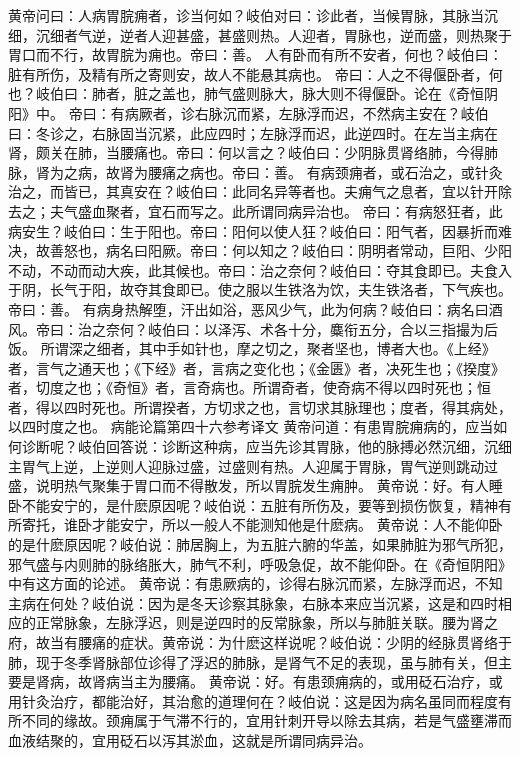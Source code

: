 \documentclass[a4paper,12pt,UTF8,twoside]{ctexbook}
\begin{document}
黄帝问曰：人病胃脘痈者，诊当何如？岐伯对曰：诊此者，当候胃脉，其脉当沉细，沉细者气逆，逆者人迎甚盛，甚盛则热。人迎者，胃脉也，逆而盛，则热聚于胃口而不行，故胃脘为痈也。帝曰：善。
人有卧而有所不安者，何也？岐伯曰：脏有所伤，及精有所之寄则安，故人不能悬其病也。
帝曰：人之不得偃卧者，何也？岐伯曰：肺者，脏之盖也，肺气盛则脉大，脉大则不得偃卧。论在《奇恒阴阳》中。
帝曰：有病厥者，诊右脉沉而紧，左脉浮而迟，不然病主安在？岐伯曰：冬诊之，右脉固当沉紧，此应四时；左脉浮而迟，此逆四时。在左当主病在肾，颇关在肺，当腰痛也。帝曰：何以言之？岐伯曰：少阴脉贯肾络肺，今得肺脉，肾为之病，故肾为腰痛之病也。帝曰：善。
有病颈痈者，或石治之，或针灸治之，而皆已，其真安在？岐伯曰：此同名异等者也。夫痈气之息者，宜以针开除去之；夫气盛血聚者，宜石而写之。此所谓同病异治也。
帝曰：有病怒狂者，此病安生？岐伯曰：生于阳也。帝曰：阳何以使人狂？岐伯曰：阳气者，因暴折而难决，故善怒也，病名曰阳厥。帝曰：何以知之？岐伯曰：阴明者常动，巨阳、少阳不动，不动而动大疾，此其候也。帝曰：治之奈何？岐伯曰：夺其食即已。夫食入于阴，长气于阳，故夺其食即已。使之服以生铁洛为饮，夫生铁洛者，下气疾也。帝曰：善。
有病身热解堕，汗出如浴，恶风少气，此为何病？岐伯曰：病名曰酒风。帝曰：治之奈何？岐伯曰：以泽泻、术各十分，麋衔五分，合以三指撮为后饭。
所谓深之细者，其中手如针也，摩之切之，聚者坚也，博者大也。《上经》者，言气之通天也；《下经》者，言病之变化也；《金匮》者，决死生也；《揆度》者，切度之也；《奇恒》者，言奇病也。所谓奇者，使奇病不得以四时死也；恒者，得以四时死也。所谓揆者，方切求之也，言切求其脉理也；度者，得其病处，以四时度之也。
病能论篇第四十六参考译文
黄帝问道：有患胃脘痈病的，应当如何诊断呢？岐伯回答说：诊断这种病，应当先诊其胃脉，他的脉搏必然沉细，沉细主胃气上逆，上逆则人迎脉过盛，过盛则有热。人迎属于胃脉，胃气逆则跳动过盛，说明热气聚集于胃口而不得散发，所以胃脘发生痈肿。
黄帝说：好。有人睡卧不能安宁的，是什麽原因呢？岐伯说：五脏有所伤及，要等到损伤恢复，精神有所寄托，谁卧才能安宁，所以一般人不能测知他是什麽病。
黄帝说：人不能仰卧的是什麽原因呢？岐伯说：肺居胸上，为五脏六腑的华盖，如果肺脏为邪气所犯，邪气盛与内则肺的脉络胀大，肺气不利，呼吸急促，故不能仰卧。在《奇恒阴阳》中有这方面的论述。
黄帝说：有患厥病的，诊得右脉沉而紧，左脉浮而迟，不知主病在何处？岐伯说：因为是冬天诊察其脉象，右脉本来应当沉紧，这是和四时相应的正常脉象，左脉浮迟，则是逆四时的反常脉象，所以与肺脏关联。腰为肾之府，故当有腰痛的症状。黄帝说：为什麽这样说呢？岐伯说：少阴的经脉贯肾络于肺，现于冬季肾脉部位诊得了浮迟的肺脉，是肾气不足的表现，虽与肺有关，但主要是肾病，故肾病当主为腰痛。
黄帝说：好。有患颈痈病的，或用砭石治疗，或用针灸治疗，都能治好，其治愈的道理何在？岐伯说：这是因为病名虽同而程度有所不同的缘故。颈痈属于气滞不行的，宜用针刺开导以除去其病，若是气盛壅滞而血液结聚的，宜用砭石以泻其淤血，这就是所谓同病异治。
\end{document}
